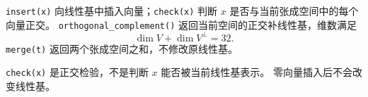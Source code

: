\texttt{insert(x)} 向线性基中插入向量；\texttt{check(x)} 判断 $x$ 是否与当前张成空间中的每个向量正交。
\texttt{orthogonal\_complement()} 返回当前空间的正交补线性基，维数满足
\[
  \dim V+\dim V^\perp=32.
\]
\texttt{merge(t)} 返回两个张成空间之和，不修改原线性基。

\begin{icpcwarning}[含义区分]
  \texttt{check(x)} 是正交检验，不是判断 $x$ 能否被当前线性基表示。
  零向量插入后不会改变线性基。
\end{icpcwarning}
